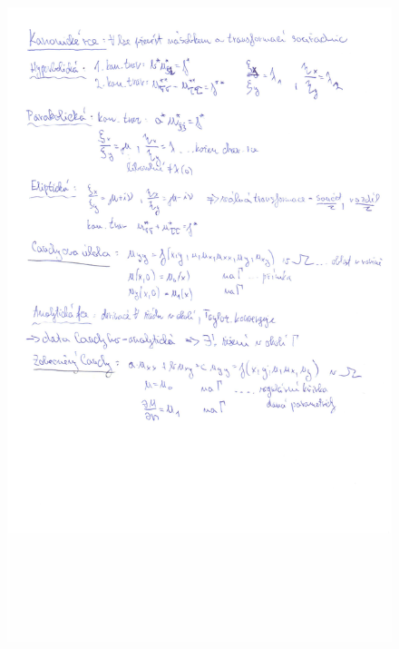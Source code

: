 \documentclass[a4]{report}
\theoremstyle{definition}
\begin{document}
\begin{figure}[H]
\includegraphics[width=\textwidth]{2-5b.jpg}
\end{figure}
\end{document}
